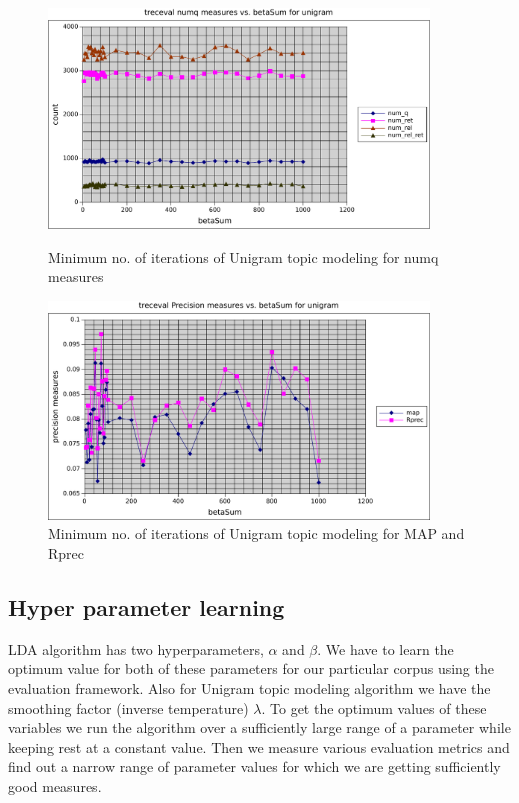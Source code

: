 \begin{figure}
    \centering
    \begin{minipage}{0.45\textwidth}
        \centering
        \includegraphics[width=0.9\textwidth]{numq_k0iter_umm.pdf}
        \caption{Minimum no. of iterations of Unigram topic modeling for numq measures}
    \end{minipage}\hfill
    \begin{minipage}{0.45\textwidth}
        \centering
        \includegraphics[width=0.9\textwidth]{prec_k0iter_umm.pdf}
        \caption{Minimum no. of iterations of Unigram topic modeling for MAP and Rprec}
    \end{minipage}
\end{figure}

\subsection{Hyper parameter learning} LDA algorithm has two hyperparameters, $ \alpha$ and $ \beta$. We have to learn the optimum value for both of these parameters for our particular corpus using the evaluation framework. Also for Unigram topic modeling algorithm we have the smoothing factor (inverse temperature) $ \lambda$. To get the optimum values of these variables we run the algorithm over a sufficiently large range of a parameter while keeping rest at a constant value. Then we measure various evaluation metrics and find out a narrow range of parameter values for which we are getting sufficiently good measures. 
